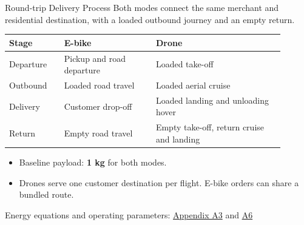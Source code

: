 \documentclass[9pt]{beamer}
\begin{document}
\begin{frame}{Round-trip Delivery Process}
\small
Both modes connect the same merchant and residential destination, with a loaded outbound journey and an empty return.
\vspace{0.5em}
\begin{center}
\renewcommand{\arraystretch}{1.35}
\begin{tabular}{@{}p{0.18\linewidth}p{0.30\linewidth}p{0.42\linewidth}@{}}
\toprule Stage & E-bike & Drone\\\midrule
Departure & Pickup and road departure & Loaded take-off\\
Outbound & Loaded road travel & Loaded aerial cruise\\
Delivery & Customer drop-off & Loaded landing and unloading hover\\
Return & Empty road travel & Empty take-off, return cruise and landing\\
\bottomrule
\end{tabular}
\end{center}
\begin{itemize}
\item Baseline payload: \textbf{1 kg} for both modes.
\item Drones serve one customer destination per flight. E-bike orders can share a bundled route.
\end{itemize}
\par\scriptsize\color{gray} Energy equations and operating parameters: \hyperlink{app:emission:3}{Appendix A3} and \hyperlink{app:emission:6}{A6}
\end{frame}
\end{document}
